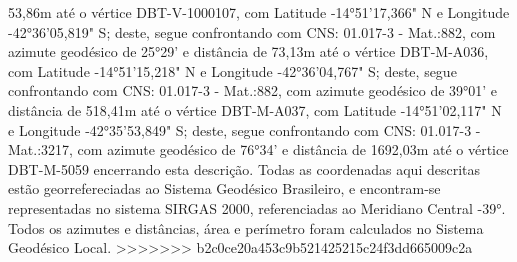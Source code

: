 53,86m  até o vértice DBT-V-1000107, com Latitude -14°51'17,366" N e Longitude -42°36'05,819" S; deste, segue confrontando com CNS: 01.017-3 - Mat.:882, com azimute geodésico de 25°29' e distância de 
73,13m  até o vértice DBT-M-A036, com Latitude -14°51'15,218" N e Longitude -42°36'04,767" S; deste, segue confrontando com CNS: 01.017-3 - Mat.:882, com azimute geodésico de 39°01' e distância de 
518,41m  até o vértice DBT-M-A037, com Latitude -14°51'02,117" N e Longitude -42°35'53,849" S; deste, segue confrontando com CNS: 01.017-3 - Mat.:3217, com azimute geodésico de 76°34' e distância de 
1692,03m  até o vértice DBT-M-5059 encerrando esta descrição. Todas as coordenadas aqui descritas estão georrefereciadas ao Sistema Geodésico Brasileiro, e encontram-se representadas no sistema SIRGAS 2000, referenciadas ao Meridiano Central -39°. Todos os azimutes e distâncias, área e perímetro foram calculados no Sistema Geodésico Local.
>>>>>>> b2c0ce20a453c9b521425215c24f3dd665009c2a
